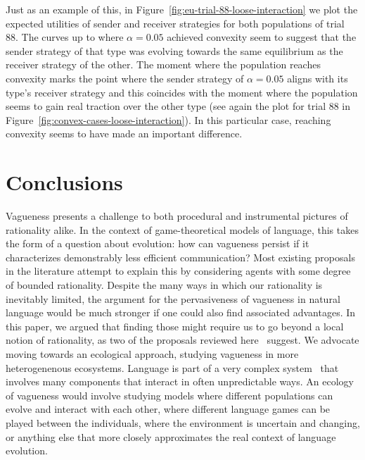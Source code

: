 \documentclass[a4paper]{article}
\begin{document}
Just as an example of this, in Figure~\ref{fig:eu-trial-88-loose-interaction} we plot the expected utilities of sender and receiver strategies for both populations of trial 88.
The curves up to where $\alpha = 0.05$ achieved convexity seem to suggest that the sender strategy of that type was evolving towards the same equilibrium as the receiver strategy of the other.
The moment where the population reaches convexity marks the point where the sender strategy of $\alpha = 0.05$ aligns with its type's receiver strategy and this coincides with the moment where the population seems to gain real traction over the other type (see again the plot for trial 88 in Figure~\ref{fig:convex-cases-loose-interaction}).
In this particular case, reaching convexity seems to have made an important difference.


\section{Conclusions}
\label{sec:conclusions}
Vagueness presents a challenge to both procedural and instrumental pictures of rationality alike.
In the context of game-theoretical models of language, this takes the form of a question about evolution: how can vagueness persist if it characterizes demonstrably less efficient communication?
Most existing proposals in the literature attempt to explain this by considering agents with some degree of bounded rationality.
Despite the many ways in which our rationality is inevitably limited, the argument for the pervasiveness of vagueness in natural language would be much stronger if one could also find associated advantages.
In this paper, we argued that finding those might require us to go beyond a local notion of rationality, as two of the proposals reviewed here~\parencite{oconnor_evolution_2014, franke_vagueness_2017} suggest.
We advocate moving towards an ecological approach, studying vagueness in more heterogenenous ecosystems.
Language is part of a very complex system~\parencite{beckner_language_2009} that involves many components that interact in often unpredictable ways.
An ecology of vagueness would involve studying models where different populations can evolve and interact with each other, where different language games can be played between the individuals, where the environment is uncertain and changing, or anything else that more closely approximates the real context of language evolution.
\end{document}

